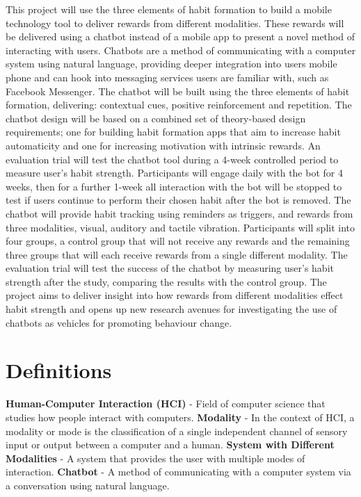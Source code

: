 \newline
This project will use the three elements of habit formation to build a mobile technology tool to deliver rewards from different modalities.
These rewards will be delivered using a chatbot instead of a mobile app to present a novel method of interacting with users.
Chatbots are a method of communicating with a computer system using natural language, providing deeper integration into users mobile phone and
can hook into messaging services users are familiar with, such as Facebook Messenger.
The chatbot will be built using the three elements of habit formation, delivering: contextual cues, positive reinforcement and repetition.
The chatbot design will be based on a combined set of theory-based design requirements;
one for building habit formation apps that aim to increase habit automaticity and one for increasing motivation with intrinsic rewards.\newline
\newline
An evaluation trial will test the chatbot tool during a 4-week controlled period to measure user's habit strength.
Participants will engage daily with the bot for 4 weeks, then for a further 1-week all interaction with the bot will be stopped to test
if users continue to perform their chosen habit after the bot is removed.
The chatbot will provide habit tracking using reminders as triggers, and rewards from three modalities, visual, auditory and tactile vibration.
Participants will split into four groups, a control group that will not receive any rewards and the remaining three groups that will each receive rewards from a single different modality.
The evaluation trial will test the success of the chatbot by measuring user's habit strength after the study, comparing the results with the control group.\newline
\newline
The project aims to deliver insight into how rewards from different modalities effect habit strength and opens up new research avenues for investigating the use of chatbots as
vehicles for promoting behaviour change.
\newpage

\section*{Definitions}

\textbf{Human-Computer Interaction (HCI)} - Field of computer science that studies how people interact with computers.\newline
\newline
\textbf{Modality} - In the context of HCI, a modality or mode is the classification of a single independent channel of sensory input or output between a computer and a human.\newline
\newline
\textbf{System with Different Modalities} - A system that provides the user with multiple modes of interaction.\newline
\newline
\textbf{Chatbot} - A method of communicating with a computer system via a conversation using natural language.

\newpage
